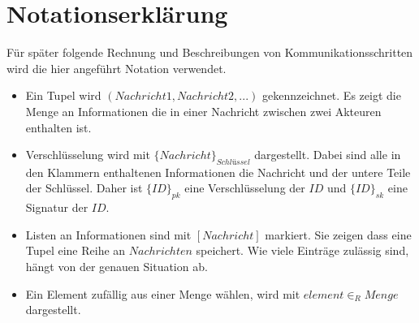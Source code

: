 \documentclass[
	fontsize=11pt,
	headings=small,
	parskip=half,           %
	bibliography=totoc,
	numbers=noenddot,       %
	open=any,               %
]{scrreprt}
\begin{document}
\section*{Notationserklärung}
Für später folgende Rechnung und Beschreibungen von Kommunikationsschritten wird die hier angeführt Notation verwendet.
\begin{itemize}
    \item Ein Tupel wird $(Nachricht 1, Nachricht 2,...)$ gekennzeichnet. Es zeigt die Menge an Informationen die in einer Nachricht zwischen zwei Akteuren enthalten ist.
    \item Verschlüsselung wird mit ${\{Nachricht\}}_{Schl\textit{ü}ssel}$ dargestellt. Dabei sind alle in den Klammern enthaltenen Informationen die Nachricht und der untere Teile der Schlüssel. Daher ist ${\{ID\}}_{pk}$ eine Verschlüsselung der $ID$ und ${\{ID\}}_{sk}$ eine Signatur der $ID$.
    \item Listen an Informationen sind mit $[Nachricht]$ markiert. Sie zeigen dass eine Tupel eine Reihe an $Nachrichten$ speichert. Wie viele Einträge zulässig sind, hängt von der genauen Situation ab.
    \item Ein Element zufällig aus einer Menge wählen, wird mit $element {\in}_{R} Menge$ dargestellt.
\end{itemize}



\end{document}
